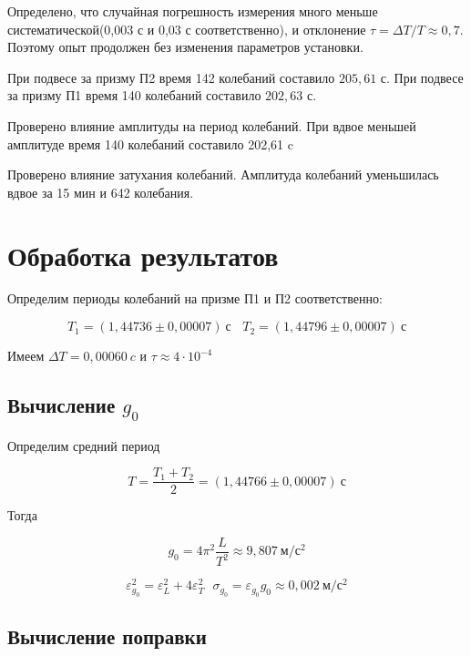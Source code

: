 \documentclass{article}
\begin{document}
Определено, что случайная погрешность измерения много меньше систематической(0,003 с и 0,03 с соответственно), и отклонение $\tau = \Delta T/T \approx 0,7 $. Поэтому опыт продолжен без изменения параметров установки.

При подвесе за призму П2 время 142 колебаний составило $205,61$ с. При подвесе за призму П1 время 140 колебаний составило $202,63$ с.

Проверено влияние амплитуды на период колебаний. При вдвое меньшей амплитуде время 140 колебаний составило 202,61 c

Проверено влияние затухания колебаний. Амплитуда колебаний уменьшилась вдвое за 15 мин и 642 колебания.

\section*{Обработка результатов}

\hspace{4mm} Определим периоды колебаний на призме П1 и П2 соответственно:

\begin{equation}
	T_1 = (1,44736 \pm 0,00007) \ с \ \ \ \ T_2 = (1,44796 \pm 0,00007) \ с
\end{equation}

Имеем $\Delta T = 0,00060 \ c$ и $\tau \approx 4\cdot 10^{-4} $

\subsection*{Вычисление $g_0$}
\hspace{4mm} Определим средний период 

\begin{equation}
	T = \frac{T_1 + T_2}{2} = (1,44766 \pm 0,00007) \ с
\end{equation}

Тогда

\begin{equation}
	g_0 = 4\pi^2 \frac{L}{T^2} \approx 9,807 \ м/с^2
\end{equation}

\begin{equation}
	\varepsilon_{g_0}^2 = \varepsilon_{L}^2 + 4 \varepsilon_T^2 \ \ \ \sigma_{g_0} = \varepsilon_{g_0} g_0 \approx 0,002 \ м/с^2
\end{equation}

\subsection*{Вычисление поправки}
\end{document}
